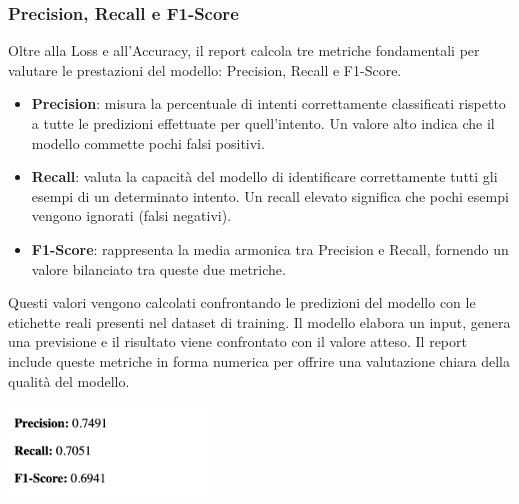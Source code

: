 \documentclass[12pt, letterpaper]{article}
\begin{document}
\subsubsection{Precision, Recall e F1-Score}
Oltre alla Loss e all’Accuracy, il report calcola tre metriche fondamentali per valutare le prestazioni del modello: Precision, Recall e F1-Score.
\begin{itemize}
	\item \textbf{Precision}: misura la percentuale di intenti correttamente classificati rispetto a tutte le predizioni effettuate per quell'intento. Un valore alto indica che il modello commette pochi falsi positivi.
	\item \textbf{Recall}: valuta la capacità del modello di identificare correttamente tutti gli esempi di un determinato intento. Un recall elevato significa che pochi esempi vengono ignorati (falsi negativi).
	\item \textbf{F1-Score}: rappresenta la media armonica tra Precision e Recall, fornendo un valore bilanciato tra queste due metriche.
\end{itemize}
Questi valori vengono calcolati confrontando le predizioni del modello con le etichette reali presenti nel dataset di training. Il modello elabora un input, genera una previsione e il risultato viene confrontato con il valore atteso. Il report include queste metriche in forma numerica per offrire una valutazione chiara della qualità del modello.

\includegraphics[width=0.4\textwidth]{immagini/prf.png}
\newpage
\end{document}
